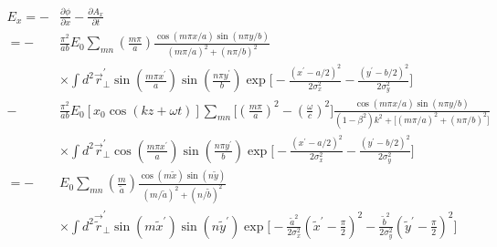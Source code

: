 \documentclass[11pt,oneside]{article}
\begin{document}
\begin{equation}
\begin{split}
  E_{x} = - & \frac{ \partial \phi }{ \partial x }
            - \frac{ \partial A_{x} }{ \partial t } \\
=
- & \frac{\pi^{2}}{ab} E_{0}
    \sum_{mn} \left( \frac{m \pi}{a} \right)
    \frac{ \cos \left( m \pi x /a \right) \sin \left( n \pi y /b \right) }
         { \left( m \pi /a \right)^{2} + \left( n \pi /b \right)^{2} } \\
  & \times
    \int d^{2} \vec{r}_{\perp}^{\prime}
    \sin \left( \frac{ m \pi x^{\prime} }{ a } \right)
    \sin \left( \frac{ n \pi y^{\prime} }{ b } \right)
    \exp \Bigg[
       - \frac{ \left( x^{\prime} - a/2 \right)^{2} }{ 2\sigma_{x}^{2}}
       - \frac{ \left( y^{\prime} - b/2 \right)^{2} }{ 2\sigma_{y}^{2}}
         \Bigg] \\
- & \frac{\pi^{2}}{ab} E_{0}
    \left[ x_{0} \cos( k z+\omega t) \right] 
    \sum_{mn} 
    \Bigg[ \left( \frac{m \pi}{a} \right)^{2} 
         - \left( \frac{\omega}{c} \right)^{2} \Bigg]
    \frac{ \cos \left( m \pi x /a \right) \sin \left( n \pi y /b \right) }
         { \left( 1 - \beta^{2} \right) k^{2}
         + \Big[
           \left( m \pi /a \right)^{2} + \left( n \pi /b \right)^{2}
           \Big] } \\
  & \times
    \int d^{2} \vec{r}_{\perp}^{\prime}
    \cos \left( \frac{ m \pi x^{\prime} }{ a } \right)
    \sin \left( \frac{ n \pi y^{\prime} }{ b } \right)
    \exp \Bigg[
       - \frac{ \left( x^{\prime} - a/2 \right)^{2} }{ 2\sigma_{x}^{2}}
       - \frac{ \left( y^{\prime} - b/2 \right)^{2} }{ 2\sigma_{y}^{2}}
         \Bigg] \\
=
- & E_{0}
    \sum_{mn} \left( \frac{m}{\tilde{a}} \right)
    \frac{ \cos \left( m \tilde{x} \right) \sin \left( n \tilde{y} \right) }
         { \left( m / \tilde{a} \right)^{2} + 
           \left( n / \tilde{b} \right)^{2} } \\
  & \times
    \int d^{2} \vec{\tilde{r}}_{\perp}^{\prime}
    \sin \left( m \tilde{x}^{\prime} \right)
    \sin \left( n \tilde{y}^{\prime} \right)
    \exp \Bigg[
       - \frac{ \tilde{a}^{2} } { 2\sigma_{x}^{2}}
         \left( \tilde{x}^{\prime} - \frac{\pi}{2} \right)^{2}
       - \frac{ \tilde{b}^{2} } { 2\sigma_{y}^{2}}
         \left( \tilde{y}^{\prime} - \frac{\pi}{2} \right)^{2}
         \Bigg] \\

\end{split}
\end{equation}
\end{document}
